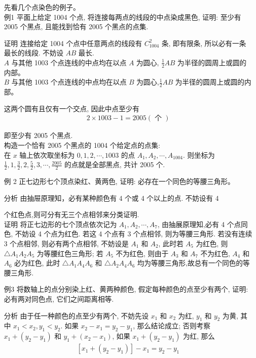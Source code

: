 \documentclass[10pt]{article}
\begin{document}
先看几个点染色的例子。\\
例1 平面上给定 1004 个点, 将连接每两点的线段的中点染成黑色, 证明: 至少有 2005 个黑点, 且能找到恰有 2005 个黑点的点集.

证明 连接给定 1004 个点中任意两点的线段有 $C_{1004}^{2}$ 条, 即有限条, 所以必有一条最长的线段. 不妨设 $A B$ 最长.\\
$A$ 与其他 1003 个点连线的中点均在以点 $A$ 为圆心, $\frac{1}{2} A B$ 为半径的圆周上或圆的内部。\\
$B$ 与其他 1003 个点连线的中点均在以点 $B$ 为圆心,$\frac{1}{2} A B$ 为半径的圆周上或圆的内部。

这两个圆有且仅有一个交点, 因此中点至少有\\
\begin{align*}
2 \times 1003-1=2005(\text { 个 })
\end{align*}

即至少有 2005 个黑点.\\
构造一个恰有 2005 个黑点的 1004 个给定点的点集:\\
在 $x$ 轴上依次取坐标为 $0,1,2, \cdots, 1003$ 的点 $A_{1}, A_{2}, \cdots, A_{1004}$. 则坐标为 $\frac{1}{2}, 1, \frac{3}{2}, 2, \frac{5}{2}, 3, \cdots, \frac{2005}{2}$ 的点就是全部黑点, 共计 2005 个.

例 2 正七边形七个顶点染红、黄两色, 证明: 必存在一个同色的等腰三角形。

分析 由抽屉原理知，必有某种颜色有 4 个或 4 个以上的点. 不妨设有 4

个红色点,则可分有无三个点相邻来分类证明.\\
证明 将正七边形的七个顶点依次记为 $A_{1}, A_{2}, \cdots, A_{7}$, 由抽展原理知,必有 4 个点同色, 不妨设 4 个点为红色. 若这 4 个点有 3 个点相邻, 则为等腰三角形. 若没有连续 3 个点相邻, 则必有两个点相邻, 不妨设是 $A_{1}$ 和 $A_{2}$, 此时若 $A_{5}$ 为红色, 则 $\triangle A_{1} A_{2} A_{5}$ 为等腰红色三角形; 若 $A_{5}$ 不为红色, 则由于 $A_{3}$ 和 $A_{7}$ 不为红色, $A_{4}$ 和 $A_{6}$ 必为红色, 此时 $\triangle A_{1} A_{4} A_{6}$ 和 $\triangle A_{2} A_{4} A_{6}$ 均为等腰三角形,故总有一个同色的等腰三角形.

例3 将数轴上的点分别染上红、黄两种颜色, 假定每种颜色的点至少有两个, 证明: 必有两对同色点, 它们之间距离相等.

分析 由于任一种颜色的点至少有两个, 不妨先设 $x_{1}$ 和 $x_{2}$ 为红, $y_{1}$ 和 $y_{2}$ 为黄, 其中 $x_{1}<x_{2}, y_{1}<y_{2}$. 如果 $x_{2}-x_{1}=y_{2}-y_{1}$, 那么结论成立; 否则考察 $x_{1}+\left(y_{2}-y_{1}\right)$ 和 $y_{1}+\left(x_{2}-x_{1}\right)$, 如果 $x_{1}+\left(y_{2}-y_{1}\right)$ 为红, 那么\\
\begin{align*}
\left[x_{1}+\left(y_{2}-y_{1}\right)\right]-x_{1}=y_{2}-y_{1}
\end{align*}
\end{document}
